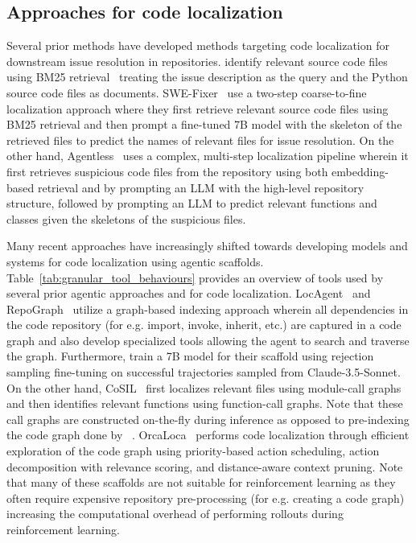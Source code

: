 \subsection{Approaches for code localization}
Several prior methods have developed methods targeting code localization for downstream issue resolution in repositories. \citet{jimenez2024swebenchlanguagemodelsresolve} identify relevant source code files using BM25 retrieval~\citep{Robertson2009ThePR} treating the issue description as the query and the Python source code files as documents. SWE-Fixer~\citep{xie-etal-2025-swe} use a two-step coarse-to-fine localization approach where they first retrieve relevant source code files using BM25 retrieval and then prompt a fine-tuned 7B model with the skeleton of the retrieved files to predict the names of relevant files for issue resolution. On the other hand, Agentless~\citep{xia2024agentless} uses a complex, multi-step localization pipeline wherein it first retrieves suspicious code files from the repository using both embedding-based retrieval and by prompting an LLM with the high-level repository structure, followed by prompting an LLM to predict relevant functions and classes given the skeletons of the suspicious files. 

Many recent approaches have increasingly shifted towards developing models and systems for code localization using agentic scaffolds. Table~\ref{tab:granular_tool_behaviours} provides an overview of tools used by several prior agentic approaches and \methodname for code localization. LocAgent~\citep{chen-etal-2025-locagent} and RepoGraph~\citep{ouyang2025repographenhancingaisoftware} utilize a graph-based indexing approach wherein all dependencies in the code repository (for e.g. import, invoke, inherit, etc.) are captured in a code graph and also develop specialized tools allowing the agent to search and traverse the graph. Furthermore, \citet{chen-etal-2025-locagent} train a 7B model for their scaffold using rejection sampling fine-tuning on successful trajectories sampled from Claude-3.5-Sonnet. On the other hand, CoSIL~\citep{jiang2025issuelocalizationllmdriveniterative} first localizes relevant files using module-call graphs and then identifies relevant functions using function-call graphs. Note that these call graphs are constructed on-the-fly during inference as opposed to pre-indexing the code graph done by ~\citet{chen-etal-2025-locagent}. OrcaLoca~\citep{yu2025orcalocallmagentframework} performs code localization through efficient exploration of the code graph using priority-based action scheduling, action decomposition with relevance scoring, and distance-aware context pruning. Note that many of these scaffolds are not suitable for reinforcement learning as they often require expensive repository pre-processing (for e.g. creating a code graph) increasing the computational overhead of performing rollouts during reinforcement learning.

